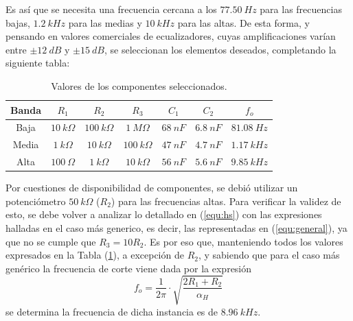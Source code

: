 Es así que se necesita una frecuencia cercana a los $77.50 \ Hz$ para las frecuencias bajas, $1.2 \ kHz$ para las medias y $10 \ kHz$ para las altas. De esta forma, y pensando en valores comerciales de ecualizadores, cuyas amplificaciones varían entre $\pm 12 \ dB$ y $\pm 15 \ dB$, se seleccionan los elementos deseados, completando la siguiente tabla:

\begin{table}[H]
\begin{center}
\begin{tabular}{ccccccc}
\hline
Banda & $R_1$ & $R_2$ & $R_3$ & $C_1$ & $C_2$ & $f_o$ \\
\hline
Baja & $10 \ k\Omega$ & $100 \ k\Omega$ & $1 \ M\Omega$ & $68 \ nF$ & $6.8 \ nF$ & $81.08 \ Hz$ \\
Media & $1 \ k\Omega$ & $10 \ k\Omega$ & $100 \ k\Omega$ & $47 \ nF$ & $4.7 \ nF$ & $1.17 \ kHz$ \\
Alta & $100 \ \Omega$ & $1 \ k\Omega$ & $10 \ k\Omega$ & $56 \ nF$ & $5.6 \ nF$ & $9.85 \ kHz$\\
\hline
\end{tabular}
\caption{Valores de los componentes seleccionados.}
\label{tabla:valores}
\end{center}
\end{table}

Por cuestiones de disponibilidad de componentes, se debió utilizar un potenciómetro $50 \ k\Omega$ ($R_2$) para las frecuencias altas. Para verificar la validez de esto, se debe volver a analizar lo detallado en (\ref{equ:hs}) con las expresiones halladas en el caso más generico, es decir, las representadas en (\ref{equ:general}), ya que no se cumple que $R_3 = 10R_2$. Es por eso que, manteniendo todos los valores expresados en la Tabla (\ref{tabla:valores}), a excepción de $R_2$, y sabiendo que para el caso más genérico la frecuencia de corte viene dada por la expresión
\begin{equation}
	f_o = \frac{1}{2\pi} \cdot \sqrt{\frac{2R_1 + R_2}{\alpha_H}}
	\label{equ:fogeneral}
\end{equation}
se determina la frecuencia de dicha instancia es de $8.96 \ kHz$.

